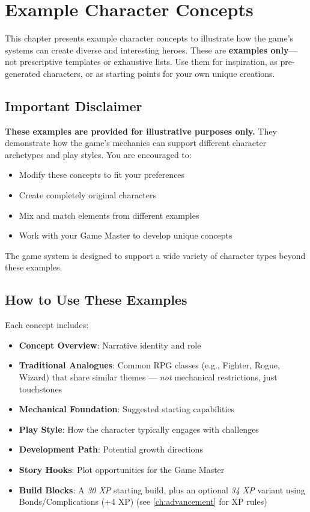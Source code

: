\chapter{Example Character Concepts}
\label{ch:example-concepts}

This chapter presents example character concepts to illustrate how the game's systems can create diverse and interesting heroes. These are \textbf{examples only}—not prescriptive templates or exhaustive lists. Use them for inspiration, as pre-generated characters, or as starting points for your own unique creations.

\section{Important Disclaimer}
\label{sec:concepts-disclaimer}

\textbf{These examples are provided for illustrative purposes only.} They demonstrate how the game's mechanics can support different character archetypes and play styles. You are encouraged to:
\begin{itemize}
\item Modify these concepts to fit your preferences
\item Create completely original characters
\item Mix and match elements from different examples
\item Work with your Game Master to develop unique concepts
\end{itemize}

The game system is designed to support a wide variety of character types beyond these examples.

\section{How to Use These Examples}
\label{sec:concepts-usage}

Each concept includes:
\begin{itemize}
\item \textbf{Concept Overview}: Narrative identity and role
\item \textbf{Traditional Analogues}: Common RPG classes (e.g., Fighter, Rogue, Wizard) that share similar themes — \textit{not} mechanical restrictions, just touchstones
\item \textbf{Mechanical Foundation}: Suggested starting capabilities
\item \textbf{Play Style}: How the character typically engages with challenges
\item \textbf{Development Path}: Potential growth directions
\item \textbf{Story Hooks}: Plot opportunities for the Game Master
\item \textbf{Build Blocks}: A \emph{30 XP} starting build, plus an optional \emph{34 XP} variant using Bonds/Complications (+4 XP) (see \ref{ch:advancement} for XP rules)
\end{itemize}

